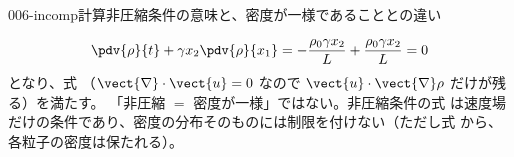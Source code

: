\documentclass[uplatex,dvipdfmx,a4paper,11pt]{jsarticle}
\begin{document}
\begin{mondai}{006-incomp}{計算}{非圧縮条件の意味と、密度が一様であることとの違い}
\begin{tadashii}
\[ \pdv{\rho}{t} + \gamma x_2\pdv{\rho}{x_1} = -\frac{\rho_0\gamma x_2}{L} + \frac{\rho_0\gamma x_2}{L} = 0 \]
となり、式 （$\vect{\nabla}\cdot\vect{u} = 0$ なので $\vect{u}\cdot\vect{\nabla}\rho$ だけが残る）を満たす。
\tsumazuki 「非圧縮 $=$ 密度が一様」ではない。非圧縮条件の式  は速度場だけの条件であり、密度の分布そのものには制限を付けない（ただし式  から、各粒子の密度は保たれる）。
\end{tadashii}
\end{mondai}

\noteowari
\end{document}
